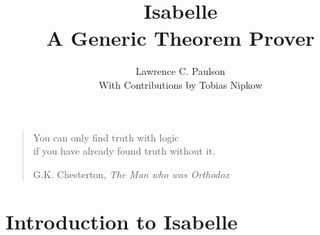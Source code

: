 
\sloppy

\title{Isabelle\\A Generic Theorem Prover}
\author{Lawrence C. Paulson\\[2ex] With Contributions by Tobias Nipkow}

\date{} 
\makeindex
\let\idx=\ttindexbold
\def\S{Sect.\thinspace}%

\underscoreoff

\setcounter{secnumdepth}{2} \setcounter{tocdepth}{1}

\binperiod     %


\maketitle



\tableofcontents
\newpage


\markboth{}{}
\vspace*{2.5cm}
\begin{quote}
\raggedleft
{\sanssi
You can only find truth with logic\\
if you have already found truth without it.}\\
\bigskip

G.K. Chesterton, {\em The Man who was Orthodox}
\end{quote}



\part{Introduction to Isabelle}   

\begingroup
\newcommand\qeq{\stackrel{?}{\equiv}}  %
\newcommand{\nand}{\mathbin{\lnot\&}} 
\newcommand{\xor}{\mathbin{\#}}
\let\part=\chapter



\endgroup

